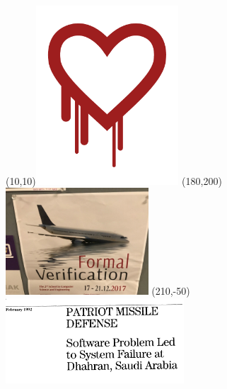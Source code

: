 \documentclass[aspectratio=169]{beamer}
\begin{document}
{ %
    \begin{frame}[plain]
         \pause

          \Put(10,10){\includegraphics[width=0.4\textwidth]{material/heartbleed.pdf}}\pause
          \Put(180,200){\includegraphics[width=0.4\textwidth]{material/formal-verification-as-a-sinking-airplane.png}}\pause
          \Put(210,-50){\includegraphics[width=0.5\textwidth]{material/us-govt-patriot-missile.png}}
     \end{frame}
}
\end{document}
